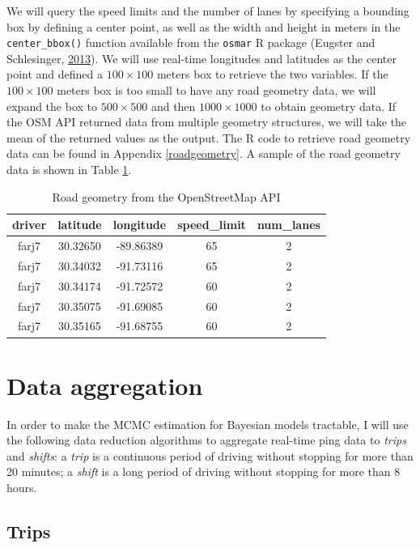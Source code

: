 \documentclass[12pt]{book}
\numberwithin{equation}{chapter}
\begin{document}
We will query the speed limits and the number of lanes by specifying a bounding box by defining a center point, as well as the width and height in meters in the \texttt{center\_bbox()} function available from the \texttt{osmar} R package (Eugster and Schlesinger, \protect\hyperlink{ref-eugster2013osmar}{2013}). We will use real-time longitudes and latitudes as the center point and defined a \(100\times100\) meters box to retrieve the two variables. If the \(100\times100\) meters box is too small to have any road geometry data, we will expand the box to \(500\times500\) and then \(1000\times1000\) to obtain geometry data. If the OSM API returned data from multiple geometry structures, we will take the mean of the returned values as the output. The R code to retrieve road geometry data can be found in Appendix \ref{roadgeometry}. A sample of the road geometry data is shown in Table \ref{tab:road}.

\begin{table}[H]

\caption{\label{tab:road}Road geometry from the OpenStreetMap API}
\centering
\begin{tabular}{ccccc}
\toprule
driver & latitude & longitude & speed\_limit & num\_lanes\\
\midrule
farj7 & 30.32650 & -89.86389 & 65 & 2\\
farj7 & 30.34032 & -91.73116 & 65 & 2\\
farj7 & 30.34174 & -91.72572 & 60 & 2\\
farj7 & 30.35075 & -91.69085 & 60 & 2\\
farj7 & 30.35165 & -91.68755 & 60 & 2\\
\bottomrule
\end{tabular}
\end{table}

\hypertarget{data-aggregation}{%
\section{Data aggregation}\label{data-aggregation}}

In order to make the MCMC estimation for Bayesian models tractable, I will use the following data reduction algorithms to aggregate real-time ping data to \emph{trips} and \emph{shifts}: a \emph{trip} is a continuous period of driving without stopping for more than 20 minutes; a \emph{shift} is a long period of driving without stopping for more than 8 hours.

\hypertarget{trips}{%
\subsection{Trips}\label{trips}}
\end{document}
